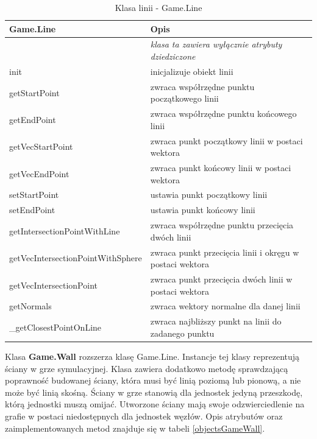 \begin{table}
\begin{center}
\begin{tabular}{|p{}|p{}|}
\hline
\textbf{Game.Line} & Opis\\\hline		
	 & \emph{klasa ta zawiera wyłącznie atrybuty dziedziczone}
\\\hline
	init & inicjalizuje obiekt linii\\
	getStartPoint & zwraca współrzędne punktu początkowego linii\\
	getEndPoint & zwraca współrzędne punktu końcowego linii\\
	getVecStartPoint & zwraca punkt początkowy linii w postaci wektora\\
	getVecEndPoint & zwraca punkt końcowy linii w postaci wektora\\ 
	setStartPoint & ustawia punkt początkowy linii\\
	setEndPoint & ustawia punkt końcowy linii\\
	getIntersectionPointWithLine & zwraca współrzędne punktu przecięcia dwóch linii\\
	getVecIntersectionPointWithSphere & zwraca punkt przecięcia linii i okręgu w postaci wektora\\
	getVecIntersectionPoint & zwraca punkt przecięcia dwóch linii w postaci wektora\\
	getNormals & zwraca wektory normalne dla danej linii\\
	\_getClosestPointOnLine & zwraca najbliższy punkt na linii do zadanego punktu 
\\\hline
\end{tabular}
\caption {Klasa linii - Game.Line\label{objectsGameLine}}
\end{center}
\end{table} 

Klasa \textbf{Game.Wall} rozszerza klasę Game.Line. Instancje tej klasy reprezentują ściany w grze symulacyjnej. Klasa zawiera dodatkowo metodę sprawdzającą poprawność budowanej ściany, która musi być linią poziomą lub pionową, a nie może być linią skośną. Ściany w grze stanowią dla jednostek jedyną przeszkodę, którą jednostki muszą omijać. Utworzone ściany mają swoje odzwierciedlenie na grafie w postaci niedostępnych dla jednostek węzłów. Opis atrybutów oraz zaimplementowanych metod znajduje się w tabeli \ref{objectsGameWall}. 

